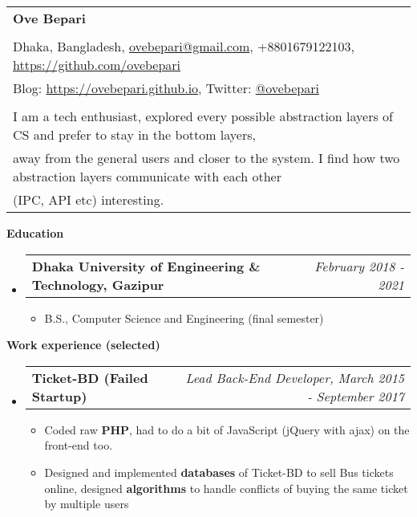 \documentclass[letterpaper,10pt]{article}
\makeatletter
\newcommand{\resheading}[1]{{\large \colorbox{mygrey}{\begin{minipage}{\textwidth}{\textbf{#1 \vphantom{p\^{E}}}}\end{minipage}}}}
\newcommand{\ressubheading}[4]{
	\begin{tabular*}{7.1in}{l@{\extracolsep{\fill}}r}
		\textbf{#1} & \textit{#4} \\
	\end{tabular*}\vspace{-6pt}}
\makeatother
\begin{document}
	
	\begin{tabular*}{7.5in}{l@{\extracolsep{\fill}}}
		\textbf{\large Ove Bepari}\\
		\\
		
		Dhaka, Bangladesh, \href{mailto:ovebepari@gmail.com}{ovebepari@gmail.com}, +8801679122103, \url{https://github.com/ovebepari} \\
		 Blog: \url{https://ovebepari.github.io}, Twitter: \href{https://twitter.com/ovebepari}{@ovebepari}
		\\
		\\
		I am a tech enthusiast, explored every possible abstraction layers of CS and prefer to stay in the bottom layers, \\away from the general users and closer to the system. I find how two abstraction layers communicate with each other\\ (IPC, API etc) interesting.
	\end{tabular*}
	
	\vspace{0.3in}
	
	\resheading{Education}
	\begin{itemize}
		
				
		\item \ressubheading{Dhaka University of Engineering \& Technology, Gazipur}{}{}{February 2018 - 2021}
		\begin{itemize}
			\item B.S., Computer Science and Engineering (final semester)
		\end{itemize}

	
	\end{itemize}
	
	
	\vspace{0.2in}
	
	\resheading{Work experience (selected)}
	\begin{itemize}
		\item \ressubheading{Ticket-BD (Failed Startup)}{}{}{Lead Back-End Developer, March 2015 - September 2017}
		\begin{itemize}
			\item Coded raw \textbf{PHP}, had to do a bit of JavaScript (jQuery with ajax) on the front-end too.
			\item Designed and implemented \textbf{databases} of Ticket-BD to sell Bus tickets online, designed \textbf{algorithms} to handle conflicts of buying the same ticket by multiple users 
		\end{itemize}
		
		
	\end{itemize}
\end{document}
